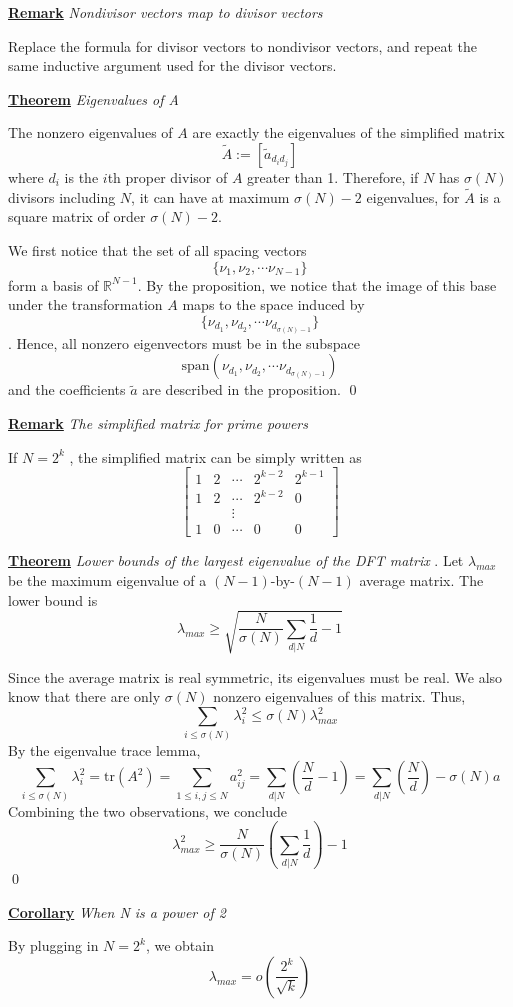 \documentclass{article}
\newcommand{\new}[2]{
    \vspace{2mm}
    \noindent
    \textbf{
    \underline{#1}}
    \textit{
        {#2}
    }
    \vspace{2mm}
    \newline
}
\begin{document}
\new {Remark} {Nondivisor vectors map to divisor vectors} 
Replace the formula for divisor vectors to nondivisor vectors, 
and repeat the same inductive argument used for the divisor vectors. 

\new {Theorem} {Eigenvalues of A}
The nonzero eigenvalues of $A$ are exactly the eigenvalues of 
the simplified matrix 
\[
    \tilde A := [\tilde a_{d_i d_j}]
\] 
where $d_i$ is the $i$th proper divisor of $A$ greater than 1. Therefore, if $N$ has 
$\sigma(N)$ divisors including $N$, it can have at maximum $\sigma(N) - 2$ eigenvalues, 
for $\tilde A$ is a square matrix of order $\sigma(N) - 2$. 

\proof We first notice that the set of all spacing vectors 
\[
    \{\nu_1, \nu_2, \cdots \nu_{N - 1}\}
\]
form a basis of $\mathbb{R}^{N-1}$. By the proposition, we notice 
that the image of this base under the transformation $A$ maps to 
the space induced by 
\[
    \{\nu_{d_1}, \nu_{d_2}, \cdots \nu_{d_{\sigma(N) - 1}}\}
\]
. Hence, all nonzero eigenvectors must be in the subspace 
\[
    \text{span}(\nu_{d_1}, \nu_{d_2}, \cdots \nu_{d_{\sigma(N) - 1}})
\]
and the coefficients $\tilde{a}$ are described in the proposition. 
\hfill \qed

\new {Remark} {The simplified matrix for prime powers}
If $N = 2^k$ , the simplified matrix can be simply 
written as 
\[
    \begin{bmatrix}
        1 & 2  & \cdots & 2^{k - 2} & 2^{k - 1} \\ 
        1 & 2 & \cdots & 2^{k - 2} & 0\\ 
        &&\vdots \\ 
        1 & 0 & \cdots &0 &0
    \end{bmatrix}
\]

\new{Theorem} {Lower bounds of the largest eigenvalue of 
the DFT matrix}. 
Let $\lambda_{max}$ be the maximum eigenvalue of a $(N-1)$-by-$(N - 1)$ 
average matrix. The lower bound is 
\[
  \lambda_{max} \geq \sqrt{
    \frac N {\sigma(N)} \sum_{d|N} \frac 1 d  -1
  }  
\]

\proof 
Since the average matrix is real symmetric, its eigenvalues 
must be real. We also know that there are only $\sigma(N)$ nonzero 
eigenvalues of this matrix. Thus, 
\[
 \sum_{i \leq \sigma(N)} \lambda_i^2 \leq \sigma(N)  \lambda_{max}^2
\]
By the eigenvalue trace lemma, 
\[
    \sum_{i \leq \sigma(N)} \lambda_i^2  = \text{tr}(A^2) = \sum_{1 \leq i, j \leq N} a_{ij}^2 
    = \sum_{d|N} \left(
        \frac N d - 1
    \right)
    = \sum_{d|N} \left(
        \frac N d
    \right) - \sigma(N)a
\]  
Combining the two observations, we conclude 
\[
\lambda_{max}^2 \geq 
    \frac N {\sigma(N)} \left(\sum_{d|N} \frac 1 d\right)  -1  
\]
\hfill \qed

\new {Corollary} {When N is a power of 2}
By plugging in $N = 2^k$, we obtain 
\[
\lambda_{max} = o\left(
    \frac {2^k} {\sqrt k}
\right)
\]
\end{document}
